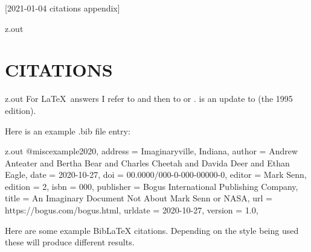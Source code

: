[2021-01-04 citations appendix]

\begin{VerbatimOut}{z.out}
\chapter{CITATIONS}
\end{VerbatimOut}

\MyIO



\begin{VerbatimOut}{z.out}
For \LaTeX\ answers I refer to
\cite{lamport1994}
and then to
\cite{goossens1994}
or
\cite{kopka1999}.
\cite{kopka1999}
is an update to \cite{kopka1995} (the 1995 edition).
\end{VerbatimOut}

\MyIO


Here is an example .bib file entry:

\begin{VerbatimOut}{z.out}
@misc{example2020,
  address   = {Imaginaryville, Indiana},
  author    = {Andrew Anteater and Bertha Bear and Charles Cheetah and Davida Deer and Ethan Eagle},
  date      = {2020-10-27},
  doi       = {00.0000/000-0-000-00000-0},
  editor    = {Mark Senn},
  edition   = {2},
  isbn      = {{000}},
  publisher = {Bogus International Publishing Company},
  title     = {An Imaginary Document Not About {Mark Senn} or {NASA}},
  url       = {https://bogus.com/bogus.html},
  urldate   = {2020-10-27},
  version   = {1.0},
}
\end{VerbatimOut}

\MyI


Here are some example BibLaTeX citations.
Depending on the style being used these will produce different results.

